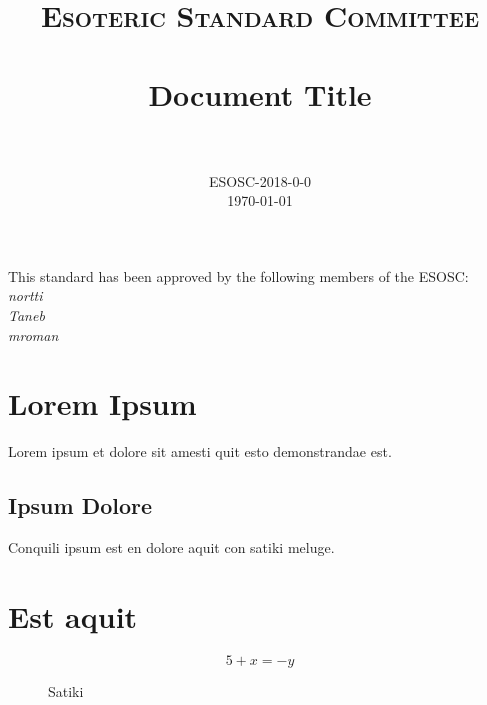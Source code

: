 \documentclass[paper=a4, fontsize=11pt]{scrartcl}
\title{
	\usefont{OT1}{bch}{b}{n}
	\normalfont \normalsize \textsc{Esoteric Standard Committee} \\ [25pt]
	\horrule{0.5pt} \\[0.4cm]
	\huge Document Title \\
	\horrule{2pt} \\[0.5cm]
}
\author{
	\normalfont\normalsize
	ESOSC-2018-0-0\\[-3pt]\normalsize
	\today
}
\date{}
\numberwithin{equation}{section}
\numberwithin{figure}{section}
\numberwithin{table}{section}
\begin{document}
\maketitle

\begin{center}
This standard has been approved by the following members of the ESOSC:\\
\textit{
nortti\\
Taneb\\
mroman}
\end{center}

\section{Lorem Ipsum}

Lorem ipsum et dolore sit amesti quit esto demonstrandae est. 

\subsection{Ipsum Dolore}

Conquili ipsum est en dolore aquit con satiki meluge. 

\newpage

\section{Est aquit}

\begin{figure}
 \begin{equation}
   5 + x = -y
 \end{equation}
 \caption{Satiki}
\end{figure}
\end{document}
